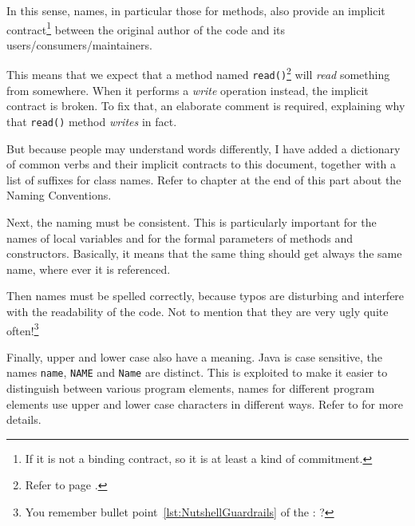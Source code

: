In this sense, names, in particular those for methods, also provide an implicit contract\footnote{If it is not a binding contract, so it is at least a kind of commitment.} between the original author of the code and its users/consumers/maintainers.

This means that we expect that a method named \lstinline|read()|\footnote{Refer to page \pageref{verb:read}.} will \textit{read} something from somewhere. When it performs a \textit{write} operation instead, the implicit contract is broken. To fix that, an elaborate comment is required, explaining why that \lstinline|read()| method \textit{writes} in fact.

But because people may understand words differently, I have added a dictionary of common verbs and their implicit contracts to this document, together with a list of suffixes for class names. Refer to chapter  at the end of this part about the Naming Conventions.

Next, the naming must be consistent. This is particularly important for the names of local variables and for the formal parameters of methods and constructors. Basically, it means that the same thing should get always the same name, where ever it is referenced.

Then names must be spelled correctly, because typos are disturbing and interfere with the readability of the code. Not to mention that they are very ugly quite often!\footnote{You remember bullet point~\ref{lst:NutshellGuardrails} of the \ngref: ?}

Finally, upper and lower case also have a meaning. Java is case sensitive, the names \lstinline|name|, \lstinline|NAME| and \lstinline|Name| are distinct. This is exploited to make it easier to distinguish between various program elements, names for different program elements use upper and lower case characters in different ways. Refer to  for more details.

